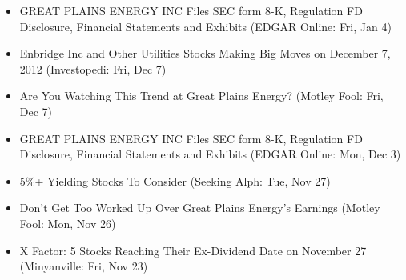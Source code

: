 \documentclass[11pt,asymmetric]{article}
\begin{document}
\begin{itemize}
\item GREAT PLAINS ENERGY INC Files SEC form 8-K, Regulation FD Disclosure, Financial Statements and Exhibits (EDGAR Online: Fri, Jan 4)
\item Enbridge Inc and Other Utilities Stocks Making Big Moves on December 7, 2012 (Investopedi: Fri, Dec 7)
\item Are You Watching This Trend at Great Plains Energy? (Motley Fool: Fri, Dec 7)
\item GREAT PLAINS ENERGY INC Files SEC form 8-K, Regulation FD Disclosure, Financial Statements and Exhibits (EDGAR Online: Mon, Dec 3)
\item 5\%+ Yielding Stocks To Consider (Seeking Alph: Tue, Nov 27)
\item Don't Get Too Worked Up Over Great Plains Energy's Earnings (Motley Fool: Mon, Nov 26)
\item X Factor: 5 Stocks Reaching Their Ex-Dividend Date on November 27 (Minyanville: Fri, Nov 23)
\end{itemize}
\end{document}
